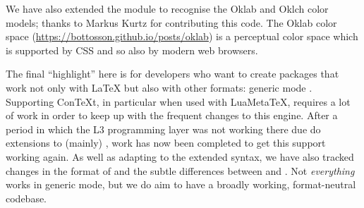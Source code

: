 \documentclass{ltnews}
\begin{document}
We have also extended the  module to recognise the Oklab and Oklch
color models;
thanks to Markus Kurtz for contributing this code. The Oklab color
space (\url{https://bottosson.github.io/posts/oklab}) is a perceptual color
space which is supported by CSS and so also by modern web browsers.

The final \enquote{highlight} here is for developers who want to create
packages that work not only with \LaTeX{} but also with other formats: 
generic mode . 
Supporting Con\TeX{}t, in particular when used with
LuaMeta\TeX{}, requires a lot of work in order to keep up with the frequent 
changes to this engine.  After a
period in which the L3 programming layer was not working there due do extensions 
to (mainly) , work has now been completed to get this
support working again. As well as adapting to the extended  syntax,
we have also tracked changes in the format of  and the subtle
differences between  and . Not \emph{everything}
works in generic mode, 
but we do aim to have a broadly working, format-neutral codebase.


\end{document}
